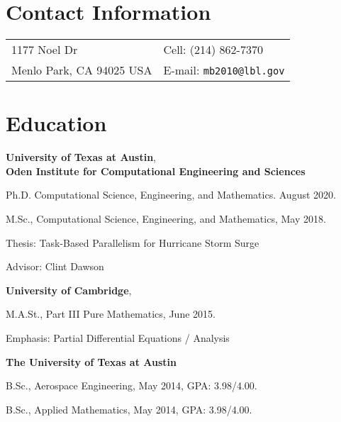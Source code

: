 \documentclass[margin,line]{res}
\newenvironment{list1}{
  \begin{list}{\ding{113}}{%
      \setlength{\itemsep}{0in}
      \setlength{\parsep}{0in} \setlength{\parskip}{0in}
      \setlength{\topsep}{0in} \setlength{\partopsep}{0in}
      \setlength{\leftmargin}{0.17in}}}{\end{list}}
\begin{document}
 

\begin{resume}

\section{\sc Contact Information} 
\begin{tabular}{@{}p{3.25in}p{4in}}
1177 Noel Dr & { Cell:} (214) 862-7370 \\
Menlo Park, CA 94025 USA & {E-mail:} {\tt mb2010@lbl.gov}
\end{tabular} 


\section{\sc Education} 

\textbf{University of Texas at Austin}, \\
\textbf{Oden Institute for Computational Engineering and Sciences} \\ 
\vspace*{-.1in} 

\begin{list1} 
\item[] Ph.D. Computational Science, Engineering, and Mathematics. August 2020.
\item[] M.Sc., Computational Science, Engineering, and Mathematics, May 2018.
\item[] Thesis: Task-Based Parallelism for Hurricane Storm Surge
\item[] Advisor: Clint Dawson
\end{list1}

\textbf{University of Cambridge}, \\
\vspace*{-.1in}

\begin{list1}
\item[] M.A.St., Part III Pure Mathematics, June 2015.
\item[] Emphasis: Partial Differential Equations / Analysis
\end{list1}

\textbf{The University of Texas at Austin} \\

\vspace*{-.1in}
\begin{list1}
\item[] B.Sc., Aerospace Engineering, May 2014, GPA: 3.98/4.00.
\item[] B.Sc., Applied Mathematics, May 2014, GPA: 3.98/4.00.
\end{list1}



\end{resume}
\end{document}

